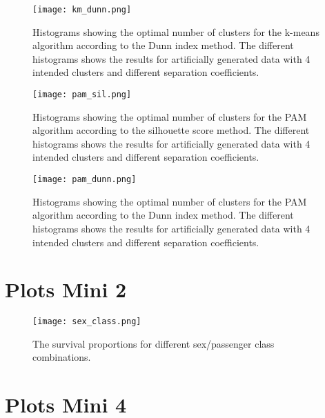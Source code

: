 \documentclass[11pt,twoside,swedish]{article}
\begin{document}
\begin{figure}
\begin{center}
\texttt{[image: km\_dunn.png]}
\caption{Histograms showing the optimal number of clusters for the k-means
  algorithm according to the Dunn index method. The different
  histograms shows the results for artificially generated data with 4
  intended clusters and different separation coefficients.}
\label{km_dunn_hists}
\end{center}
\end{figure}


\begin{figure}
\begin{center}
\texttt{[image: pam\_sil.png]}
\caption{Histograms showing the optimal number of clusters for the PAM
  algorithm according to the silhouette score method. The different
  histograms shows the results for artificially generated data with 4
  intended clusters and different separation coefficients.}
\label{pam_sil_hists}
\end{center}
\end{figure}

\begin{figure}
\begin{center}
\texttt{[image: pam\_dunn.png]}
\caption{Histograms showing the optimal number of clusters for the PAM
  algorithm according to the Dunn index method. The different
  histograms shows the results for artificially generated data with 4
  intended clusters and different separation coefficients.}
\label{pam_dunn_hists}
\end{center}
\end{figure}


\newpage
\section{Plots Mini 2}\label{Plots Mini 2}

\graphicspath{{/home/mikael/Repos/Courses/msa220/Mini/Mini2/Titanic/}}
\begin{figure}[!htb]
\begin{center}
\texttt{[image: sex\_class.png]}
\caption{The survival proportions for different sex/passenger class combinations.}
\label{titanic sex pclass}
\end{center}
\end{figure}

\newpage

\section{Plots Mini 4}\label{Plots Mini 4}
\end{document}
